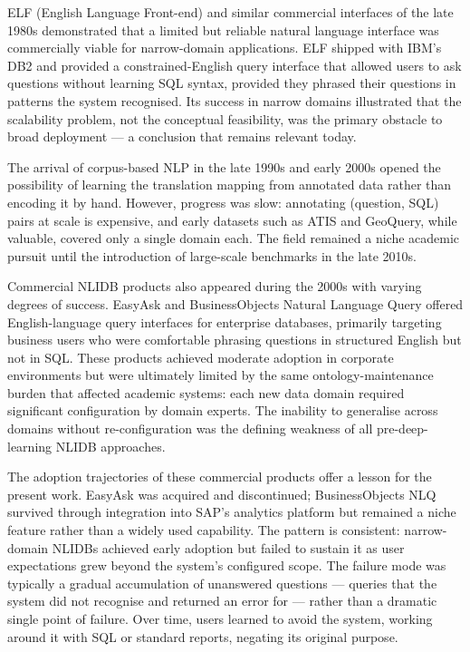 \documentclass[12pt,a4paper]{report}
\begin{document}
ELF (English Language Front-end) and similar commercial interfaces of the late 1980s demonstrated that a limited but reliable natural language interface was commercially viable for narrow-domain applications. ELF shipped with IBM's DB2 and provided a constrained-English query interface that allowed users to ask questions without learning SQL syntax, provided they phrased their questions in patterns the system recognised. Its success in narrow domains illustrated that the scalability problem, not the conceptual feasibility, was the primary obstacle to broad deployment — a conclusion that remains relevant today.

The arrival of corpus-based \ac{NLP} in the late 1990s and early 2000s opened the possibility of learning the translation mapping from annotated data rather than encoding it by hand. However, progress was slow: annotating (question, \ac{SQL}) pairs at scale is expensive, and early datasets such as ATIS and GeoQuery, while valuable, covered only a single domain each. The field remained a niche academic pursuit until the introduction of large-scale benchmarks in the late 2010s.

Commercial \ac{NLIDB} products also appeared during the 2000s with varying degrees of success. EasyAsk and BusinessObjects Natural Language Query offered English-language query interfaces for enterprise databases, primarily targeting business users who were comfortable phrasing questions in structured English but not in \ac{SQL}. These products achieved moderate adoption in corporate environments but were ultimately limited by the same ontology-maintenance burden that affected academic systems: each new data domain required significant configuration by domain experts. The inability to generalise across domains without re-configuration was the defining weakness of all pre-deep-learning \ac{NLIDB} approaches.

The adoption trajectories of these commercial products offer a lesson for the present work. EasyAsk was acquired and discontinued; BusinessObjects NLQ survived through integration into SAP's analytics platform but remained a niche feature rather than a widely used capability. The pattern is consistent: narrow-domain NLIDBs achieved early adoption but failed to sustain it as user expectations grew beyond the system's configured scope. The failure mode was typically a gradual accumulation of unanswered questions — queries that the system did not recognise and returned an error for — rather than a dramatic single point of failure. Over time, users learned to avoid the system, working around it with SQL or standard reports, negating its original purpose.
\end{document}
